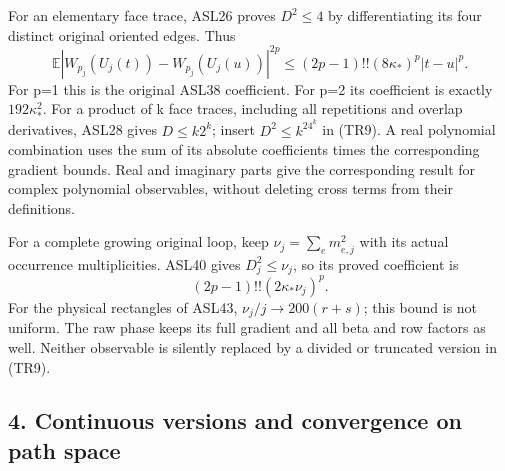 \documentclass[11pt]{article}
\begin{document}
For an elementary face trace, ASL26 proves \(D^2\le4\) by differentiating its four distinct original oriented edges. Thus
\[
 \mathbb E|W_{p_j}(U_j(t))-W_{p_j}(U_j(u))|^{2p}
 \le (2p-1)!!(8\kappa_*)^p|t-u|^p.
 \tag{TR10}
\]
For p=1 this is the original ASL38 coefficient. For p=2 its coefficient is exactly \(192\kappa_*^2\). For a product of k face traces, including all repetitions and overlap derivatives, ASL28 gives \(D\le k2^k\); insert \(D^2\le k^24^k\) in (TR9). A real polynomial combination uses the sum of its absolute coefficients times the corresponding gradient bounds. Real and imaginary parts give the corresponding result for complex polynomial observables, without deleting cross terms from their definitions.

For a complete growing original loop, keep \(\nu_j=\sum_e m_{e,j}^2\) with its actual occurrence multiplicities. ASL40 gives \(D_j^2\le\nu_j\), so its proved coefficient is
\[
 (2p-1)!!(2\kappa_*\nu_j)^p.
 \tag{TR11}
\]
For the physical rectangles of ASL43, \(\nu_j/j\to200(r+s)\); this bound is not uniform. The raw phase keeps its full gradient and all beta and row factors as well. Neither observable is silently replaced by a divided or truncated version in (TR9).

\subsection*{4. Continuous versions and convergence on path space}
\end{document}
